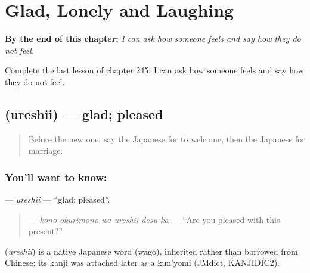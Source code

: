
\chapter{Glad, Lonely and Laughing}
\label{ch:ja-glad-lonely-and-laughing}

\begin{chapteropening}
\textbf{By the end of this chapter:} \emph{I can ask how someone feels and say how they do not feel.}

Complete the last lesson of chapter 245: I can ask how someone feels and say how they do not feel.
\end{chapteropening}

\section[\texorpdfstring{\ja{うれしい} (ureshii)}{うれしい (ureshii)}]{ (ureshii) — glad; pleased}

\label{lesson:JA-C245-ureshii}



\begin{quote}
Before the new one: say the Japanese for to welcome, then the Japanese for marriage.
\end{quote}

\subsection*{You'll want to know: }
\textbf{} — \emph{ureshii} — \textquotedblleft{}glad; pleased\textquotedblright{}.

\begin{quote}
\textbf{  } — \emph{kono okurimono wa ureshii desu ka} — \textquotedblleft{}Are you pleased with this present?\textquotedblright{}
\end{quote}

\begin{cousinweb}
\textbf{} (\emph{ureshii}) is a native Japanese word (wago), inherited rather than borrowed from Chinese; its kanji was attached later as a kun'yomi (JMdict, KANJIDIC2).
\end{cousinweb}

